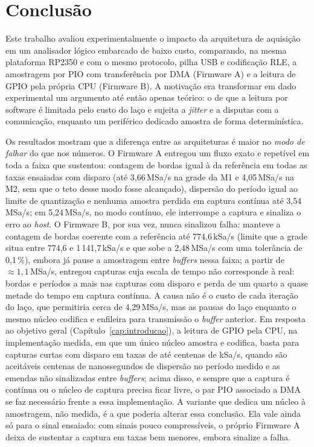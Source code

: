 \chapter{Conclusão}\label{cap:conclusao}

Este trabalho avaliou experimentalmente o impacto da arquitetura de aquisição
em um analisador lógico embarcado de baixo custo, comparando, na mesma
plataforma RP2350 e com o mesmo protocolo, pilha \ac{USB} e codificação
\ac{RLE}, a amostragem por \ac{PIO} com transferência por \ac{DMA} (Firmware A)
e a leitura de \ac{GPIO} pela própria \ac{CPU} (Firmware B). A motivação era
transformar em dado experimental um argumento até então apenas teórico: o de
que a leitura por software é limitada pelo custo do laço e sujeita a
\emph{jitter} e a disputas com a comunicação, enquanto um periférico dedicado
amostra de forma determinística.

Os resultados mostram que a diferença entre as arquiteturas é maior no
\emph{modo de falhar} do que nos números. O Firmware A entregou um fluxo
exato e repetível em toda a faixa que sustentou: contagem de bordas igual à
da referência em todas as taxas ensaiadas com disparo (até 3,66\,MSa/s na
grade da M1 e 4,05\,MSa/s na M2, sem que o teto desse modo fosse alcançado),
dispersão do período igual ao limite de quantização e nenhuma amostra
perdida em captura contínua até 3,54\,MSa/s; em 5,24\,MSa/s, no modo
contínuo, ele interrompe a captura e sinaliza o erro ao \emph{host}. O
Firmware B, por sua vez, nunca sinalizou falha: manteve a contagem de bordas
coerente com a referência até 774,6\,kSa/s (limite que a grade situa entre
774,6 e 1\,141,7\,kSa/s e que sobe a 2,48\,MSa/s com uma tolerância de
0,1\,\%), embora já pause a amostragem entre \emph{buffers} nessa faixa; a
partir de $\approx 1{,}1$\,MSa/s, entregou capturas cuja escala de tempo não corresponde à real: bordas e
períodos a mais nas capturas com disparo e perda de um quarto a quase metade
do tempo em captura contínua. A causa não é o custo de cada iteração do
laço, que permitiria cerca de 4,29\,MSa/s, mas as pausas do laço enquanto o
mesmo núcleo codifica e enfileira para transmissão o \emph{buffer} anterior.
Em resposta ao objetivo geral (Capítulo~\ref{cap:introducao}), a leitura de
\ac{GPIO} pela \ac{CPU}, na implementação medida, em que um único núcleo
amostra e codifica, basta para capturas curtas com disparo em taxas de até
centenas de kSa/s, quando são aceitáveis centenas de nanossegundos de
dispersão no período medido e as emendas não sinalizadas entre
\emph{buffers}; acima disso, e sempre que a captura é contínua ou o núcleo de
captura precisa ficar livre, o par \ac{PIO} associado a \ac{DMA} se faz
necessário frente a essa implementação. A variante que dedica um núcleo à
amostragem, não medida, é a que poderia alterar essa conclusão. Ela vale
ainda só para o sinal ensaiado: com sinais pouco compressíveis, o próprio
Firmware A deixa de sustentar a captura em taxas bem menores, embora sinalize
a falha.

